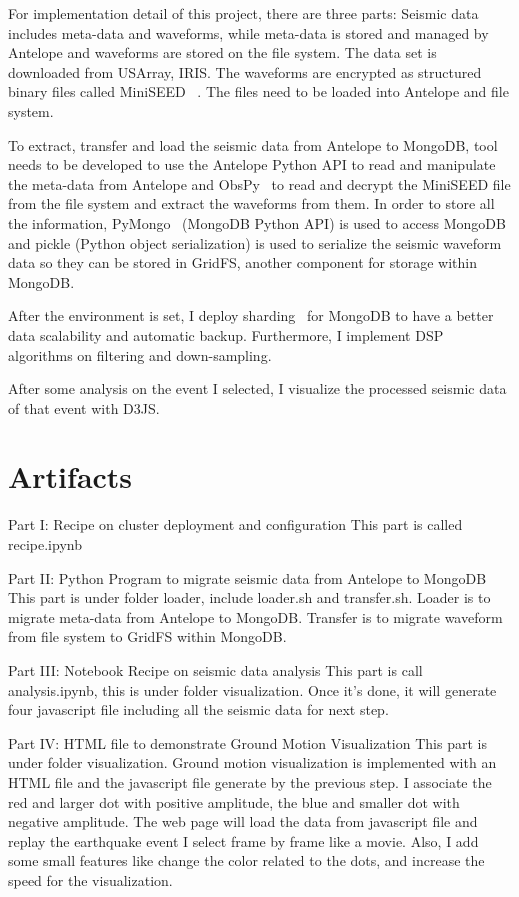 \documentclass{acm_proc_article-sp}
\begin{document}
For implementation detail of this project, there are three parts:
Seismic data includes meta-data and waveforms, while meta-data is stored and managed by Antelope and waveforms are stored on the file system. The data set is downloaded from USArray, IRIS. The waveforms are encrypted as structured binary files called MiniSEED ~\cite{MiniSeed}. The files need to be loaded into Antelope and file system. 

To extract, transfer and load the seismic data from Antelope to MongoDB, tool needs to be developed to use the Antelope Python API to read and manipulate the meta-data from Antelope and ObsPy~\cite{ObsPy} to read and decrypt the MiniSEED file from the file system and extract the waveforms from them. In order to store all the information, PyMongo~\cite{PyMongo} (MongoDB Python API) is used to access MongoDB and pickle (Python object serialization) is used to serialize the seismic waveform data so they can be stored in GridFS, another component for storage within MongoDB. 
 
After the environment is set, I deploy sharding~\cite{shard} for MongoDB to have a better data scalability and automatic backup. Furthermore, I implement DSP algorithms on filtering and down-sampling.

After some analysis on the event I selected, I visualize the processed seismic data of that event with D3JS.


\section{Artifacts}

Part I:
Recipe on cluster deployment and configuration
This part is called recipe.ipynb

Part II:
Python Program to migrate seismic data from Antelope to MongoDB
This part is under folder loader, include loader.sh and transfer.sh. Loader is to migrate meta-data from Antelope to MongoDB. Transfer is to migrate waveform from file system to GridFS within MongoDB.

Part III:
Notebook Recipe on seismic data analysis
This part is call analysis.ipynb, this is under folder visualization. Once it's done, it will generate four javascript file including all the seismic data for next step.

Part IV:
HTML file to demonstrate Ground Motion Visualization
This part is under folder visualization. Ground motion visualization is implemented with an HTML file and the javascript file generate by the previous step. I associate the red and larger dot with positive amplitude, the blue and smaller dot with negative amplitude. The web page will load the data from javascript file and replay the earthquake event I select frame by frame like a movie. Also, I add some small features like change the color related to the dots, and increase the speed for the visualization.




\end{document}
